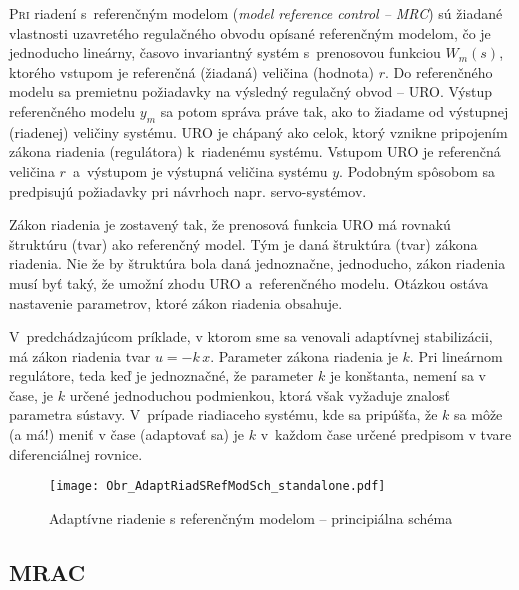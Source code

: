 \documentclass[a4paper, 10pt, ]{article}
\begin{document}
\lettrine[lines=3, nindent=0pt]{P}{ri} riadení s~referenčným modelom (\emph{model reference control -- MRC}) sú žiadané vlastnosti uzavretého regulačného obvodu opísané referenčným modelom, čo je jednoducho lineárny, časovo invariantný systém s~prenosovou funkciou $W_m(s)$, ktorého vstupom je referenčná (žiadaná) veličina (hodnota) $r$. Do referenčného modelu sa premietnu požiadavky na výsledný regulačný obvod -- URO. Výstup referenčného modelu $y_m$ sa potom správa práve tak, ako to žiadame od výstupnej (riadenej) veličiny systému.  URO je chápaný ako celok, ktorý vznikne pripojením zákona riadenia (regulátora) k~riadenému systému. Vstupom URO je referenčná veličina $r$~a~výstupom je výstupná veličina systému $y$. Podobným spôsobom sa predpisujú požiadavky pri návrhoch napr. servo-systémov.


Zákon riadenia  je zostavený tak, že prenosová funkcia URO má rovnakú štruktúru (tvar) ako referenčný model. Tým je daná štruktúra (tvar) zákona riadenia. Nie že by štruktúra bola daná jednoznačne, jednoducho, zákon riadenia musí byť taký, že umožní zhodu URO a~referenčného modelu. Otázkou ostáva nastavenie parametrov, ktoré zákon riadenia obsahuje.

V~predchádzajúcom príklade, v ktorom sme sa venovali adaptívnej stabilizácii, má zákon riadenia tvar $u = -k\, x$. Parameter zákona riadenia je $k$. Pri lineárnom regulátore, teda keď je jednoznačné, že parameter $k$ je konštanta, nemení sa v čase, je $k$ určené jednoduchou podmienkou, ktorá však vyžaduje znalosť parametra sústavy. V~prípade riadiaceho systému, kde sa pripúšťa, že $k$ sa môže (a má!) meniť v čase (adaptovať sa) je $k$ v~každom čase určené predpisom v tvare diferenciálnej rovnice.








\begin{figure}[!t]
\centering

	\texttt{[image: Obr\_AdaptRiadSRefModSch\_standalone.pdf]}

	\caption{Adaptívne riadenie s referenčným modelom -- principiálna schéma}
	\label{Adaptívne riadenie s referenčným modelom --- principiálna schéma}

\end{figure}







\subsection{MRAC}
\end{document}
